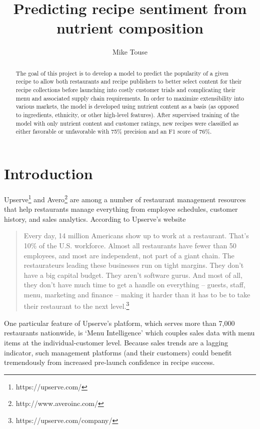 \documentclass[]{scrartcl}
\title{Predicting recipe sentiment from nutrient composition}
\author{Mike Touse}
\begin{document}
\maketitle

\begin{abstract}
The goal of this project is to develop a model to predict the popularity of a given recipe to allow both restaurants and recipe publishers to better select content for their recipe collections before launching into costly customer trials and complicating their menu and associated supply chain requirements.  In order to maximize extensibility into various markets, the model is developed using nutrient content as a basis (as opposed to ingredients, ethnicity, or other high-level features).  After supervised training of the model with only nutrient content and customer ratings, new recipes were classified as either favorable or unfavorable with 75\% precision and an F1 score of 76\%.  
\end{abstract}

\section*{Introduction}
Upserve\footnote{https://upserve.com/} and Avero\footnote{http://www.averoinc.com/} are among a number of restaurant management resources that help restaurants manage everything from employee schedules, customer history, and sales analytics.  According to Upserve's website
\begin{quote}
	Every day, 14 million Americans show up to work at a restaurant. That’s 10\% of the U.S. workforce. Almost all restaurants have fewer than 50 employees, and most are independent, not part of a giant chain. The restaurateurs leading these businesses run on tight margins. They don’t have a big capital budget. They aren’t software gurus. And most of all, they don’t have much time to get a handle on everything – guests, staff, menu, marketing and finance – making it harder than it has to be to take their restaurant to the next level.\footnote{https://upserve.com/company/}
	\end{quote}

One particular feature of Upserve's platform, which serves more than 7,000 restaurants nationwide, is `Menu Intelligence' which couples sales data with menu items at the individual-customer level.  Because sales trends are a lagging indicator, such management platforms (and their customers) could benefit tremendously from increased pre-launch confidence in recipe success.  
\end{document}
